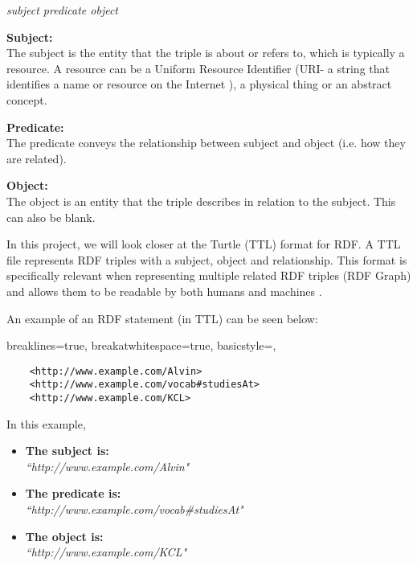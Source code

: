 \vspace{-0.1cm}
\begin{center}
\begin{displayquote}
   \textit{subject predicate object}
\end{displayquote} 
\end{center}
\vspace{-0.2cm}

\textbf{Subject:} \\
The subject is the entity that the triple is about or refers to, which is typically a resource. A resource can be a Uniform Resource Identifier (URI- a string that identifies a name or resource on the Internet \cite{sikos_2015}), a physical thing or an abstract concept. 

\textbf{Predicate:} \\
The predicate conveys the relationship between subject and object (i.e. how they are related). 

\textbf{Object:} \\
The object is an entity that the triple describes in relation to the subject. This can also be blank. 

In this project, we will look closer at the Turtle (TTL) format for RDF. A TTL file represents RDF triples with a subject, object and relationship. This format is specifically relevant when representing multiple related RDF triples (RDF Graph) and allows them to be readable by both humans and machines \cite{TTL}.

An example of an RDF statement (in TTL) can be seen below:

\vspace{-0.4cm}
\begin{center}
\lstset
{
    breaklines=true,
    breakatwhitespace=true,
    basicstyle=\linespread{1.5}\ttfamily,
}
\begin{lstlisting}
    <http://www.example.com/Alvin> 
    <http://www.example.com/vocab#studiesAt> 
    <http://www.example.com/KCL>
\end{lstlisting}
\end{center} 
\vspace{-0.3cm}

\noindent In this example, 
\vspace{-0.15cm}
\begin{itemize}
    \itemsep0em 
\item \textbf{The subject is:} \\ \textit{``http://www.example.com/Alvin"}
\item \textbf{The predicate is:} \\ \textit{``http://www.example.com/vocab\#studiesAt"}
\item \textbf{The object is:} \\ \textit{``http://www.example.com/KCL"}
\end{itemize}
\vspace{-0.1cm}

